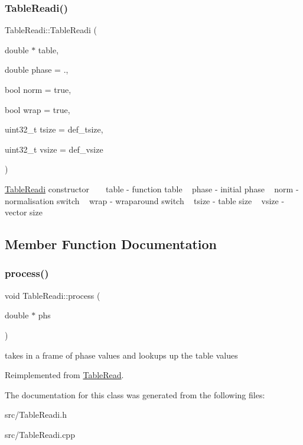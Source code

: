\subsubsection{\texorpdfstring{Table\+Readi()}{TableReadi()}}
{\footnotesize\ttfamily Table\+Readi\+::\+Table\+Readi (\begin{DoxyParamCaption}\item[{double $\ast$}]{table,  }\item[{double}]{phase = {.},  }\item[{bool}]{norm = {\ttfamily true},  }\item[{bool}]{wrap = {\ttfamily true},  }\item[{uint32\+\_\+t}]{tsize = {\ttfamily def\+\_\+tsize},  }\item[{uint32\+\_\+t}]{vsize = {\ttfamily def\+\_\+vsize} }\end{DoxyParamCaption})\hspace{0.3cm}{\ttfamily [inline]}}

\hyperlink{class_table_readi}{Table\+Readi} constructor ~\newline
~\newline
table -\/ function table ~\newline
phase -\/ initial phase ~\newline
norm -\/ normalisation switch ~\newline
wrap -\/ wraparound switch ~\newline
tsize -\/ table size ~\newline
vsize -\/ vector size ~\newline


\subsection{Member Function Documentation}
\mbox{\label{class_table_readi_a636913b122affaa2b7bde68114f35a4a}} 
\subsubsection{\texorpdfstring{process()}{process()}}
{\footnotesize\ttfamily void Table\+Readi\+::process (\begin{DoxyParamCaption}\item[{double $\ast$}]{phs }\end{DoxyParamCaption})\hspace{0.3cm}{\ttfamily [virtual]}}

takes in a frame of phase values and lookups up the table values 

Reimplemented from \hyperlink{class_table_read_ada219536a398309150f5f1270ac9534e}{Table\+Read}.



The documentation for this class was generated from the following files\+:\begin{DoxyCompactItemize}
\item 
src/Table\+Readi.\+h\item 
src/Table\+Readi.\+cpp\end{DoxyCompactItemize}
